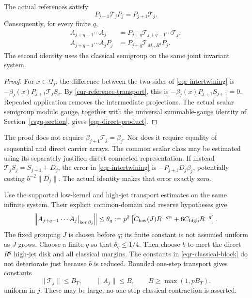 \begin{lemma}
\label{eqr-telescope-lemma}
The actual references satisfy
\begin{equation}
 P_{j+1}\mathcal T_jP_j=P_{j+1}\mathcal T_j.
 \label{eqr-intertwining}
\end{equation}
Consequently, for every finite $q$,
\begin{align}
 A_{j+q-1}\cdots A_j
   &=P_{j+q}\mathcal T_{j+q-1}\cdots\mathcal T_j,
       \label{eqr-product}\\
 A_{j+q-1}\cdots A_jP_j
   &=P_{j+q}\mathcal T_{M_j,R^q}P_j.
       \label{eqr-direct-product}
\end{align}
The second identity uses the classical semigroup on the same joint
invariant system.
\end{lemma}
\begin{proof}
For $x\in\mathcal Q_j$, the difference between the two sides of
\eqref{eqr-intertwining} is
$-\beta_j(x)P_{j+1}\mathcal T_jS_j$.
By \eqref{eqr-reference-transport}, this is
$-\beta_j(x)P_{j+1}S_{j+1}=0$.
Repeated application removes the intermediate projections.
The actual scalar semigroup modulo gauge, together with the
universal summable-gauge identity of Section~\ref{csgq-section},
gives \eqref{eqr-direct-product}.
\end{proof}

The proof does not require
$\beta_{j+1}\mathcal T_j=\beta_j$.
Nor does it require equality of sequential and direct carrier arrays.
The common scalar class may be estimated using its separately
justified direct connected representation. If instead
$\mathcal T_jS_j=S_{j+1}+D_j$, the error in
\eqref{eqr-intertwining} is
$-P_{j+1}D_j\beta_j$, potentially costing
$b^{-2}\|D_j\|$. The actual identity makes that error exactly zero.

Use the supported low-kernel and high-jet transport estimates on the
same infinite system. Their explicit common-domain and reserve
hypotheses give
\begin{equation}
 \left\|A_{j+q-1}\cdots A_j\big|_{\ker\beta_j}\right\|
 \le\theta_q:=
 p^2\left[C_{\rm low}(J)R^{-q\alpha}
                     +6C_{\rm high}R^{-q}\right].
 \label{eqr-classical-block}
\end{equation}
The fixed grouping $J$ is chosen before $q$; its finite constant is
not assumed uniform as $J$ grows. Choose a finite $q$ so that
$\theta_q\le1/4$. Then choose $b$ to meet the direct $R^q$
high-jet disk and all classical margins. The constants in
\eqref{eqr-classical-block} do not deteriorate just because $b$
is reduced. Bounded one-step transport gives constants
\begin{equation}
 \|\mathcal T_j\|\le B_T,\qquad
                 \|A_j\|\le B,\qquad B\ge\max(1,pB_T),
 \label{eqr-one-step-linear}
\end{equation}
uniform in $j$. These may be large; no one-step classical
contraction is asserted.

